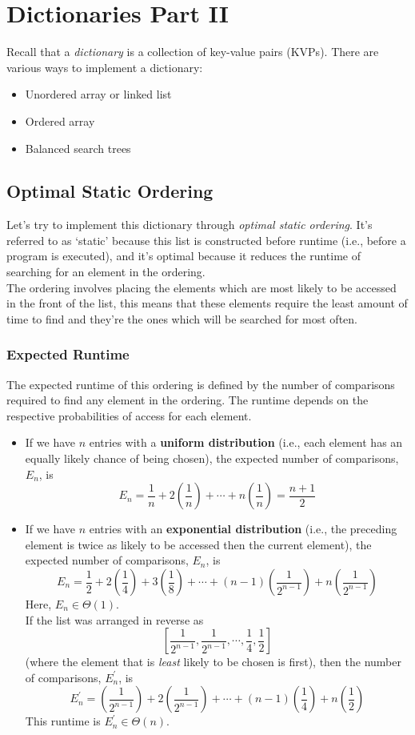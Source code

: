 \documentclass{report}
\begin{document}
\section{Dictionaries Part II}
Recall that a \textit{dictionary} is a collection of key-value pairs (KVPs). There are various ways to implement a dictionary:
\begin{itemize}
\item Unordered array or linked list
\item Ordered array
\item Balanced search trees
\end{itemize}
\subsection{Optimal Static Ordering}
Let's try to implement this dictionary through \textit{optimal static ordering}. It's referred to as `static' because this list is constructed before runtime (i.e., before a program is executed), and it's optimal because it reduces the runtime of searching for an element in the ordering.\\
The ordering involves placing the elements which are most likely to be accessed in the front of the list, this means that these elements require the least amount of time to find and they're the ones which will be searched for most often.
\subsubsection{Expected Runtime}
The expected runtime of this ordering is defined by the number of comparisons required to find any element in the ordering. The runtime depends on the respective probabilities of access for each element.\\
\begin{itemize}
\item If we have $n$ entries with a \textbf{uniform distribution} (i.e., each element has an equally likely chance of being chosen), the expected number of comparisons, $E_n$, is
$$E_n = \frac{1}{n} + 2\left(\frac{1}{n}\right) + \cdots + n\left(\frac{1}{n}\right) = \frac{n+1}{2}$$
\item If we have $n$ entries with an \textbf{exponential distribution} (i.e., the preceding element is twice as likely to be accessed then the current element), the expected number of comparisons, $E_n$, is
$$E_n = \frac{1}{2} + 2\left(\frac{1}{4}\right) + 3\left(\frac{1}{8}\right) + \cdots + (n-1)\left(\frac{1}{2^{n-1}}\right) + n\left(\frac{1}{2^{n-1}}\right)$$
Here, $E_n \in \Theta(1)$.\\
If the list was arranged in reverse as
$$\left[ \frac{1}{2^{n-1}}, \frac{1}{2^{n-1}}, \cdots, \frac{1}{4}, \frac{1}{2}\right]$$
(where the element that is \textit{least} likely to be chosen is first), then the number of comparisons, $E_n^\prime$, is
$$E_n^\prime = \left(\frac{1}{2^{n-1}}\right) + 2\left(\frac{1}{2^{n-1}}\right) + \cdots +  (n-1)\left(\frac{1}{4}\right) + n\left(\frac{1}{2}\right)$$
This runtime is $E_n^\prime \in \Theta(n)$.
\end{itemize}
\end{document}
